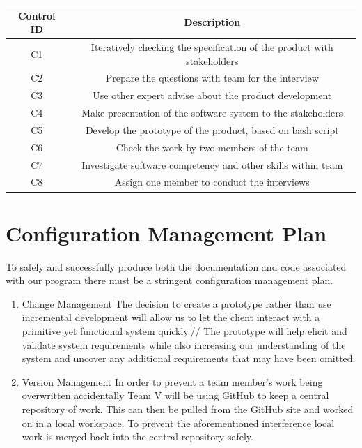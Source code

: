 \documentclass{l3deliverable}
\begin{document}
{\begin{center}{
\begin{tabular}{|c|c|}
\hline \textbf{Control ID} & \textbf{Description}\\
\hline C1 &  Iteratively checking the specification of the product with stakeholders\\
\hline C2 & Prepare the questions with team for the interview\\
\hline C3 & Use other expert advise about the product development\\
\hline C4 & Make presentation of the software system to the stakeholders\\
\hline C5 & Develop the prototype of the product, based on bash script\\
\hline C6 & Check the work by two members of the team\\
\hline C7 & Investigate software competency and other skills within team\\
\hline C8 & Assign one member to conduct the interviews\\
\hline
\end{tabular} }
\end{center}


\section{Configuration Management Plan}

To safely and successfully produce both the documentation and code
associated with our program there must be a stringent configuration
management plan.\\

\begin {enumerate}
\item Change Management
The decision to create a prototype rather than use incremental
development will allow us to let the client interact with a primitive
yet functional system quickly.//
The prototype will help elicit and validate system requirements while
also increasing our understanding of the system and uncover any
additional requirements that may have been omitted.\\

\item Version Management
In order to prevent a team member's work being overwritten
accidentally Team V will be using GitHub to keep a central repository
of work. This can then be pulled from the GitHub site and worked on in
a local workspace. To prevent the aforementioned interference local work is
merged back into the central repository safely.\\  


\end{enumerate}}
\end{document}
